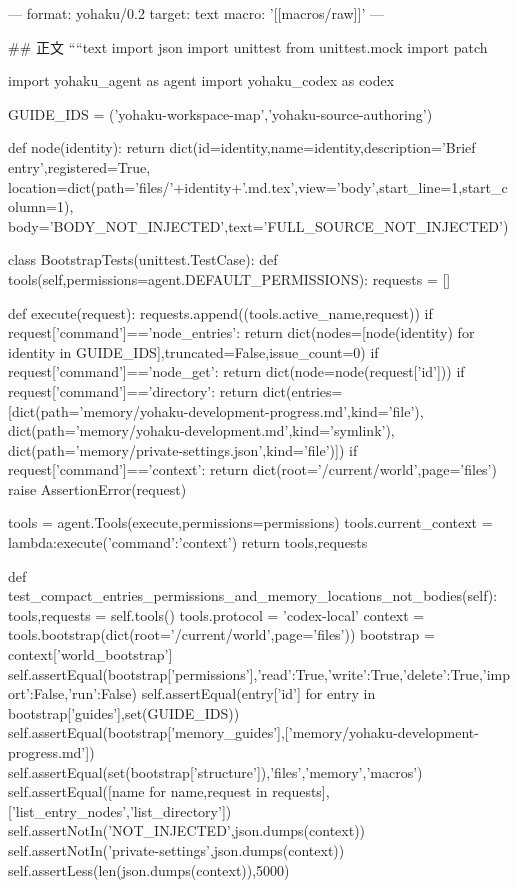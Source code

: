 ---
format: yohaku/0.2
target: text
macro: '[[macros/raw]]'
---

## 正文
````text
import json
import unittest
from unittest.mock import patch

import yohaku_agent as agent
import yohaku_codex as codex


GUIDE_IDS = ('yohaku-workspace-map','yohaku-source-authoring')


def node(identity):
    return dict(id=identity,name=identity,description='Brief entry',registered=True,
                location=dict(path='files/'+identity+'.md.tex',view='body',start_line=1,start_column=1),
                body='BODY_NOT_INJECTED',text='FULL_SOURCE_NOT_INJECTED')


class BootstrapTests(unittest.TestCase):
    def tools(self,permissions=agent.DEFAULT_PERMISSIONS):
        requests = []

        def execute(request):
            requests.append((tools.active_name,request))
            if request['command']=='node_entries':
                return dict(nodes=[node(identity) for identity in GUIDE_IDS],truncated=False,issue_count=0)
            if request['command']=='node_get':
                return dict(node=node(request['id']))
            if request['command']=='directory':
                return dict(entries=[dict(path='memory/yohaku-development-progress.md',kind='file'),
                                     dict(path='memory/yohaku-development.md',kind='symlink'),
                                     dict(path='memory/private-settings.json',kind='file')])
            if request['command']=='context':
                return dict(root='/current/world',page='files')
            raise AssertionError(request)

        tools = agent.Tools(execute,permissions=permissions)
        tools.current_context = lambda:execute({'command':'context'})
        return tools,requests

    def test_compact_entries_permissions_and_memory_locations_not_bodies(self):
        tools,requests = self.tools()
        tools.protocol = 'codex-local'
        context = tools.bootstrap(dict(root='/current/world',page='files'))
        bootstrap = context['world_bootstrap']
        self.assertEqual(bootstrap['permissions'],{'read':True,'write':True,'delete':True,'import':False,'run':False})
        self.assertEqual({entry['id'] for entry in bootstrap['guides']},set(GUIDE_IDS))
        self.assertEqual(bootstrap['memory_guides'],['memory/yohaku-development-progress.md'])
        self.assertEqual(set(bootstrap['structure']),{'files','memory','macros'})
        self.assertEqual([name for name,request in requests],['list_entry_nodes','list_directory'])
        self.assertNotIn('NOT_INJECTED',json.dumps(context))
        self.assertNotIn('private-settings',json.dumps(context))
        self.assertLess(len(json.dumps(context)),5000)

